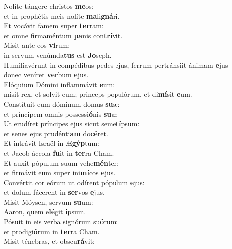 \oddverse Nolíte tángere christos \textbf{me}os:~\*\\
\oddverse et in prophétis meis nolíte \textbf{ma}li\textbf{gná}ri.\\
\evenverse Et vocávit famem super \textbf{ter}ram:~\*\\
\evenverse et omne firmaméntum \textbf{pa}nis con\textbf{trí}vit.\\
\oddverse Misit ante eos \textbf{vi}rum:~\*\\
\oddverse in servum venúmda\textbf{tus} est \textbf{Jo}seph.\\
\evenverse Humiliavérunt in compédibus pedes ejus, ferrum pertránsiit ánimam \textbf{e}jus~\*\\
\evenverse donec veníret \textbf{ver}bum \textbf{e}jus.\\
\oddverse Elóquium Dómini inflammávit \textbf{e}um:~\*\\
\oddverse misit rex, et solvit eum; princeps populórum, et di\textbf{mí}sit \textbf{e}um.\\
\evenverse Constítuit eum dóminum domus \textbf{su}æ:~\*\\
\evenverse et príncipem omnis possessi\textbf{ó}nis \textbf{su}æ:\\
\oddverse Ut erudíret príncipes ejus sicut seme\textbf{tí}psum:~\*\\
\oddverse et senes ejus prudénti\textbf{am} do\textbf{cé}ret.\\
\evenverse Et intrávit Israël in Æ\textbf{gýp}tum:~\*\\
\evenverse et Jacob áccola \textbf{fu}it in \textbf{ter}ra Cham.\\
\oddverse Et auxit pópulum suum vehe\textbf{mén}ter:~\*\\
\oddverse et firmávit eum super ini\textbf{mí}cos \textbf{e}jus.\\
\evenverse Convértit cor eórum ut odírent pópulum \textbf{e}jus:~\*\\
\evenverse et dolum fácerent in \textbf{ser}vos \textbf{e}jus.\\
\oddverse Misit Móysen, servum \textbf{su}um:~\*\\
\oddverse Aaron, quem e\textbf{lé}git \textbf{i}psum.\\
\evenverse Pósuit in eis verba signórum su\textbf{ó}rum:~\*\\
\evenverse et prodigi\textbf{ó}rum in \textbf{ter}ra Cham.\\
\oddverse Misit ténebras, et obscu\textbf{rá}vit:~\*\\
